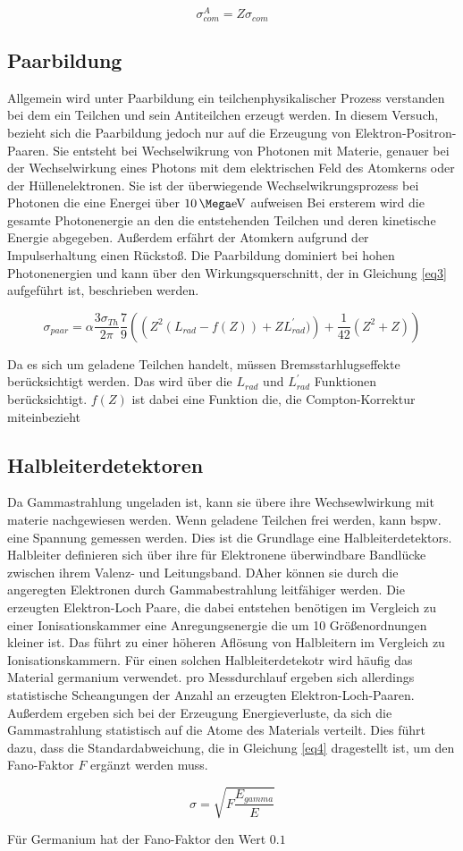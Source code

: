 \begin{equation}
    \sigma^A_{com} = Z \sigma_{com}
\end{equation}

\subsection{Paarbildung}
Allgemein wird unter Paarbildung ein teilchenphysikalischer Prozess verstanden bei dem 
ein Teilchen und sein Antiteilchen erzeugt werden. In diesem Versuch, bezieht sich die 
Paarbildung jedoch nur auf die Erzeugung von Elektron-Positron-Paaren. 
Sie entsteht bei Wechselwikrung von Photonen mit Materie, genauer bei der 
Wechselwirkung eines Photons mit dem elektrischen Feld des Atomkerns oder der 
Hüllenelektronen. 
Sie ist der überwiegende Wechselwikrungsprozess bei Photonen die eine Energei 
über $\SI{10}{\Mega\electronvolt}$ aufweisen
Bei ersterem wird die gesamte Photonenergie an den die 
entstehenden Teilchen und deren kinetische Energie abgegeben. Außerdem erfährt 
der Atomkern aufgrund der Impulserhaltung einen Rückstoß.
Die Paarbildung dominiert bei hohen Photonenergien und kann über den 
Wirkungsquerschnitt, der in Gleichung \ref{eq3} aufgeführt ist, beschrieben werden.

\begin{equation}
    \sigma_{paar} = \alpha \frac{3 \sigma_{Th}}{2 \pi} \frac{7}{9} \left( \left( Z^2 (L_{rad} - f(Z)) + Z L^'_{rad}) \right) + \frac{1}{42} \left(Z^2 + Z \right) \right)
    \label{eq3}
\end{equation}

Da es sich um geladene Teilchen handelt, müssen Bremsstarhlugseffekte berücksichtigt 
werden. Das wird über die $L_{rad}$ und $L^'_{rad}$ Funktionen berücksichtigt. 
$f(Z)$ ist dabei eine Funktion die, die Compton-Korrektur miteinbezieht


\subsection{Halbleiterdetektoren}
Da Gammastrahlung ungeladen ist, kann sie übere ihre Wechsewlwirkung mit materie 
nachgewiesen werden. Wenn geladene Teilchen frei werden, kann bspw. eine 
Spannung gemessen werden. Dies ist die Grundlage eine Halbleiterdetektors.
Halbleiter definieren sich über ihre für Elektronene überwindbare 
Bandlücke zwischen ihrem Valenz- und Leitungsband. DAher können sie durch die 
angeregten Elektronen durch Gammabestrahlung leitfähiger werden. 
Die erzeugten Elektron-Loch Paare, die dabei entstehen benötigen im Vergleich zu einer 
Ionisationskammer eine Anregungsenergie die um 10 Größenordnungen kleiner ist. 
Das führt zu einer höheren Aflösung von Halbleitern im Vergleich zu Ionisationskammern.
Für einen solchen Halbleiterdetekotr wird häufig das Material germanium verwendet.
pro Messdurchlauf ergeben sich allerdings statistische Scheangungen der Anzahl an 
erzeugten Elektron-Loch-Paaren. Außerdem ergeben sich bei der Erzeugung Energieverluste,
da sich die Gammastrahlung statistisch auf die Atome des Materials verteilt.
Dies führt dazu, dass die Standardabweichung, die in Gleichung \ref{eq4} dragestellt ist,
um den Fano-Faktor $F$ ergänzt werden muss.

\begin{equation}
    \sigma = \sqrt{F \frac{E_{gamma}}{E}}
    \label{eq4}
\end{equation}

Für Germanium hat der Fano-Faktor den Wert $\num{0,1}$

\cite{sample}
